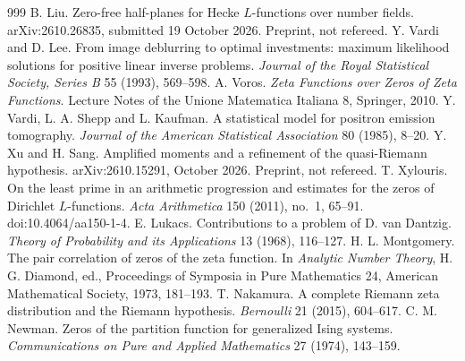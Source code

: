 \begin{thebibliography}{999}
 B. Liu. Zero-free half-planes for Hecke $L$-functions over number fields. arXiv:2610.26835, submitted 19 October 2026. Preprint, not refereed. %
 Y. Vardi and D. Lee. From image deblurring to optimal investments: maximum likelihood solutions for positive linear inverse problems. \emph{Journal of the Royal Statistical Society, Series B} 55 (1993), 569--598.
 A. Voros. \emph{Zeta Functions over Zeros of Zeta Functions}. Lecture Notes of the Unione Matematica Italiana 8, Springer, 2010.
 Y. Vardi, L. A. Shepp and L. Kaufman. A statistical model for positron emission tomography. \emph{Journal of the American Statistical Association} 80 (1985), 8--20.
 Y. Xu and H. Sang. Amplified moments and a refinement of the quasi-Riemann hypothesis. arXiv:2610.15291, October 2026. Preprint, not refereed. %
 T. Xylouris. On the least prime in an arithmetic progression and estimates for the zeros of Dirichlet $L$-functions. \emph{Acta Arithmetica} 150 (2011), no.~1, 65--91. doi:10.4064/aa150-1-4. %
 E. Lukacs. Contributions to a problem of D. van Dantzig. \emph{Theory of Probability and its Applications} 13 (1968), 116--127.
 H. L. Montgomery. The pair correlation of zeros of the zeta function. In \emph{Analytic Number Theory}, H. G. Diamond, ed., Proceedings of Symposia in Pure Mathematics 24, American Mathematical Society, 1973, 181--193.
 T. Nakamura. A complete Riemann zeta distribution and the Riemann hypothesis. \emph{Bernoulli} 21 (2015), 604--617.
 C. M. Newman. Zeros of the partition function for generalized Ising systems. \emph{Communications on Pure and Applied Mathematics} 27 (1974), 143--159.

\end{thebibliography}
